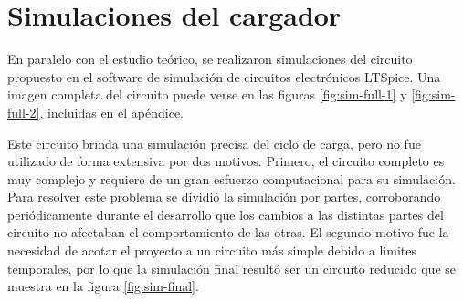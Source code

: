 \section{Simulaciones del cargador}

En paralelo con el estudio teórico, se realizaron simulaciones del circuito propuesto en el software de simulación de circuitos electrónicos LTSpice.
Una imagen completa del circuito puede verse en las figuras \ref{fig:sim-full-1} y \ref{fig:sim-full-2}, incluidas en el apéndice.

Este circuito brinda una simulación precisa del ciclo de carga, pero no fue utilizado de forma extensiva por dos motivos.
Primero, el circuito completo es muy complejo y requiere de un gran esfuerzo computacional para su simulación.
Para resolver este problema se dividió la simulación por partes,
corroborando periódicamente durante el desarrollo que los cambios a las distintas partes del circuito no afectaban el comportamiento de las otras.
El segundo motivo fue la necesidad de acotar el proyecto a un circuito más simple debido a limites temporales,
por lo que la simulación final resultó ser un circuito reducido que se muestra en la figura \ref{fig:sim-final}.